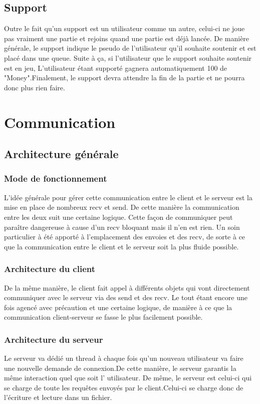 \documentclass[12pt,a4paper]{article}
\begin{document}
\subsection{Support}
Outre le fait qu'un support est un utilisateur comme un autre, celui-ci ne joue pas vraiment une partie et rejoins quand une partie est déjà lancée. De manière générale, le support indique le pseudo de l'utilisateur qu'il souhaite soutenir et est placé dans une queue. Suite à ça, si l'utilisateur que le support souhaite soutenir est en jeu, L'utilisateur étant supporté gagnera automatiquement 100 de "Money".Finalement, le support devra attendre la fin de la partie et ne pourra donc plus rien faire.
\section{Communication}
\subsection{Architecture générale}
\subsubsection{Mode de fonctionnement}
L'idée générale pour gérer cette communication entre le client et le serveur est la mise en place de nombreux recv et send. De cette manière la communication entre les deux suit une certaine logique. Cette façon de communiquer peut paraître dangereuse à cause d'un recv bloquant mais il n'en est rien. Un soin particulier à été apporté à l'emplacement des envoies et des recv, de sorte à ce que la communication entre le client et le serveur soit la plus fluide possible.
\subsubsection{Architecture du client}
De la même manière, le  client fait appel à différents objets qui vont directement communiquer avec le serveur via des send et des recv. Le tout étant encore une fois agencé avec précaution et une certaine logique, de manière à ce que la communication client-serveur se fasse le plus facilement possible.
\subsubsection{Architecture du serveur}
Le serveur va dédié un \gls{thread}  à chaque fois qu'un nouveau \gls{utilisateur} va faire une nouvelle demande de connexion.De cette manière, le serveur garantis la même interaction quel que soit l' \gls{utilisateur}. De même, le serveur est celui-ci qui se charge de toute les requêtes envoyés par le client.Celui-ci se charge donc de l'écriture et lecture dans un fichier.
\end{document}
